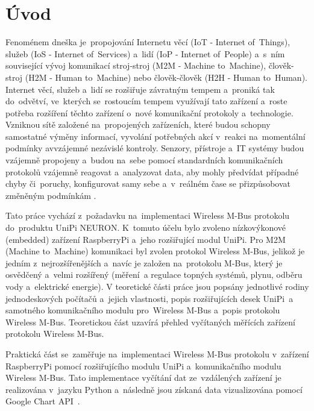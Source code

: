 \chapter*{Úvod}
{}

Fenoménem dneška je~propojování Internetu věcí (IoT - Internet of~Things), služeb (IoS - Internet of~Services) a~lidí (IoP - Internet of~People) a~s~ním související vývoj komunikací stroj-stroj (M2M - Machine to~Machine), člověk-stroj (H2M - Human to~Machine) nebo člověk-člověk (H2H - Human to~Human). Internet věcí, služeb a~lidí se rozšiřuje závratným tempem a~proniká tak do~odvětví, ve~kterých se~rostoucím tempem využívají tato zařízení a~roste potřeba rozšíření těchto zařízení o~nové komunikační protokoly a~technologie. Vzniknou sítě založené na~propojených zařízeních, které budou schopny samostatné výměny informací, vyvolání potřebných akcí v~reakci na~momentální podmínky avvzájemné nezávislé kontroly. Senzory, přístroje a~IT systémy budou vzájemně propojeny a~budou na~sebe pomocí standardních komunikačních protokolů vzájemně reagovat a~analyzovat data, aby mohly předvídat případné chyby či~poruchy, konfigurovat samy sebe a~v~reálném čase se přizpůsobovat změněným 
podmínkám \cite{uvod_prumysl_4_pdf,uvod_prumysl_4_web}.

Tato práce vychází z~požadavku na~implementaci Wireless M-Bus protokolu do~produktu UniPi NEURON. K~tomuto účelu bylo zvoleno nízkovýkonové (embedded) zařízení RaspberryPi a~jeho rozšiřující modul UniPi. Pro M2M (Machine to~Machine) komunikaci byl zvolen protokol Wireless M-Bus, jelikož je jedním z~nejrozšířenějších a~navíc je založen na~protokolu M-Bus, který je osvědčený a~velmi rozšířený (měření~a regulace topných systémů, plynu, odběru vody a~elektrické energie). V teoretické části práce jsou popsány jednotlivé rodiny jednodeskových počítačů a~jejich vlastnosti, popis rozšiřujících desek UniPi~a samotného komunikačního modulu pro~Wireless M-Bus a~popis protokolu Wireless M-Bus. Teoretickou část uzavírá přehled vyčítaných měřících zařízení protokolu Wireless M-Bus. 

Praktická část se~zaměřuje na~implementaci Wireless M-Bus protokolu v~zařízení RaspberryPi pomocí rozšiřujícího modulu UniPi a~komunikačního modulu Wireless M-Bus. Tato implementace vyčítání dat ze~vzdálených zařízení je realizována v~jazyku Python a~následně jsou získaná data vizualizována pomocí Google Chart API~\cite{uvod_google_charts_api}.


 